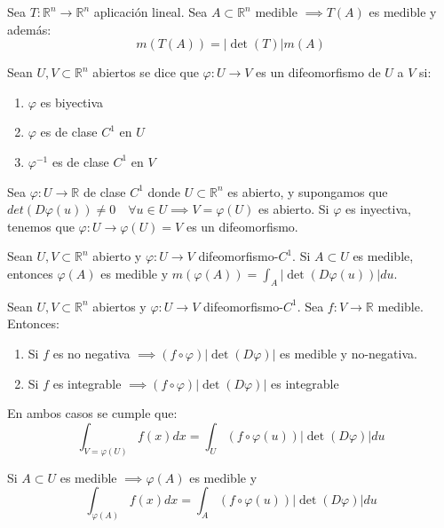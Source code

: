     \begin{teorema}
        Sea $T: \mathbb{R}^n \to \mathbb{R}^n$ aplicación lineal. Sea $A \subset \mathbb{R}^n$ medible $\implies T(A)$ es medible y además:
        \[m(T(A)) = |\det(T)|m(A)\]
    \end{teorema}
    \begin{definición} 
    Sean $U, V \subset \mathbb{R}^n$ abiertos se dice que $\varphi: U \to V$ es un difeomorfismo de $U$ a $V$ si:
    \vspace{-0.5em}
    \begin{enumerate}
        \item $\varphi$ es biyectiva
        \item $\varphi$ es de clase $C^1$ en $U$
        \item $\varphi^{-1}$ es de clase $C^1$ en $V$
    \end{enumerate}
    \end{definición}
    \begin{observación}
    Sea $\varphi: U \to \mathbb{R}$ de clase $C^1$ donde $U \subset \mathbb{R}^n$ es abierto, y supongamos que $det(D\varphi(u)) \neq 0 \quad \forall u \in U \implies V = \varphi(U)$ es abierto. Si $\varphi$ es inyectiva, tenemos que $\varphi: U \to \varphi(U) = V$ es un difeomorfismo.
    \end{observación}
    
    \begin{teorema}
        Sean $U, V \subset \mathbb{R}^n$ abierto y $\varphi: U \to V$ difeomorfismo-$C^{1}$. Si $A \subset U$ es medible, entonces $\varphi(A)$ es medible y $m(\varphi(A)) = \int_{A}|\det(D\varphi(u))|du$.
    \end{teorema}
    
    \begin{teorema}
        Sean $U,V \subset \mathbb{R}^n$ abiertos y $\varphi: U \to V$ difeomorfismo-$C^1$. Sea $f: V \to \mathbb{R}$ medible. Entonces:
        \begin{enumerate}
            \item Si $f$ es no negativa $\implies (f \circ \varphi) |\det(D\varphi)|$ es medible
                  y no-negativa.
            \item Si $f$ es integrable $\implies (f \circ \varphi)|\det(D\varphi)|$ es integrable \end{enumerate}
        En ambos casos se cumple que:
        $$\int_{V = \varphi(U)} f(x)dx = \int_U (f \circ \varphi(u))|\det(D\varphi)|du$$
    \end{teorema}
    \begin{observación}
    Si $A \subset U$ es medible $\implies \varphi(A)$ es medible y
    $$\int_{\varphi(A)}f(x)dx = \int_{A}(f \circ \varphi(u))|\det(D\varphi)|du$$
    \end{observación}
    
